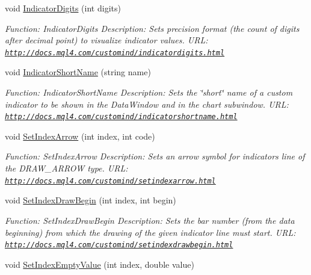\begin{DoxyCompactItemize}
void \hyperlink{class_m_q_l4_c_sharp_1_1_base_1_1_m_q_l_base_a797b1befb00b1b4cdcb848b0878eaa6a}{Indicator\+Digits} (int digits)
\begin{DoxyCompactList}\small\item\em Function\+: Indicator\+Digits Description\+: Sets precision format (the count of digits after decimal point) to visualize indicator values. U\+RL\+: \href{http://docs.mql4.com/customind/indicatordigits.html}{\tt http\+://docs.\+mql4.\+com/customind/indicatordigits.\+html} \end{DoxyCompactList}\item 
void \hyperlink{class_m_q_l4_c_sharp_1_1_base_1_1_m_q_l_base_ae7f0cf99e0655e477d1f2b441dde81d7}{Indicator\+Short\+Name} (string name)
\begin{DoxyCompactList}\small\item\em Function\+: Indicator\+Short\+Name Description\+: Sets the \char`\"{}short\char`\"{} name of a custom indicator to be shown in the Data\+Window and in the chart subwindow. U\+RL\+: \href{http://docs.mql4.com/customind/indicatorshortname.html}{\tt http\+://docs.\+mql4.\+com/customind/indicatorshortname.\+html} \end{DoxyCompactList}\item 
void \hyperlink{class_m_q_l4_c_sharp_1_1_base_1_1_m_q_l_base_ac2504b0391b9818c7f7d096f77751f25}{Set\+Index\+Arrow} (int index, int code)
\begin{DoxyCompactList}\small\item\em Function\+: Set\+Index\+Arrow Description\+: Sets an arrow symbol for indicators line of the D\+R\+A\+W\+\_\+\+A\+R\+R\+OW type. U\+RL\+: \href{http://docs.mql4.com/customind/setindexarrow.html}{\tt http\+://docs.\+mql4.\+com/customind/setindexarrow.\+html} \end{DoxyCompactList}\item 
void \hyperlink{class_m_q_l4_c_sharp_1_1_base_1_1_m_q_l_base_a2b09b0a4af8a36a22dc80c7589471c89}{Set\+Index\+Draw\+Begin} (int index, int begin)
\begin{DoxyCompactList}\small\item\em Function\+: Set\+Index\+Draw\+Begin Description\+: Sets the bar number (from the data beginning) from which the drawing of the given indicator line must start. U\+RL\+: \href{http://docs.mql4.com/customind/setindexdrawbegin.html}{\tt http\+://docs.\+mql4.\+com/customind/setindexdrawbegin.\+html} \end{DoxyCompactList}\item 
void \hyperlink{class_m_q_l4_c_sharp_1_1_base_1_1_m_q_l_base_a66bc69eb121d2ddb36eb434323e51f67}{Set\+Index\+Empty\+Value} (int index, double value)

\end{DoxyCompactItemize}
